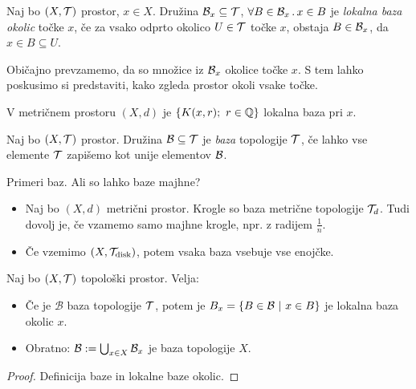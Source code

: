 \begin{definicija}
    Naj bo $(X, \mathcal{T})$ prostor, $x \in X$. Družina $\mathcal{B}_x \subseteq \mathcal{T}$, $\forall B \in \mathcal{B}_x \,.\, x \in B$ je \emph{lokalna baza okolic} točke $x$, če za vsako odprto okolico $U \in \mathcal{T}$ točke $x$, obstaja $B \in \mathcal{B}_x$, da $x \in B \subseteq U$.
\end{definicija}

\begin{opomba}
    Običajno prevzamemo, da so množice iz $\mathcal{B}_x$ okolice točke $x$. S tem lahko poskusimo si predstaviti, kako zgleda prostor okoli vsake točke.
\end{opomba}

\begin{primer}
    V metričnem prostoru $(X, d)$ je $\left\{K(x,r); \ r \in \mathbb{Q}\right\}$ lokalna baza pri $x$.
\end{primer}

\begin{definicija}
    Naj bo $(X, \mathcal{T})$ prostor. Družina $\mathcal{B} \subseteq \mathcal{T}$ je \emph{baza} topologije $\mathcal{T}$, če lahko vse elemente $\mathcal{T}$ zapišemo kot unije elementov $\mathcal{B}$.
\end{definicija}

\begin{primer}
    Primeri baz. Ali so lahko baze majhne?
    \begin{itemize}
        \item Naj bo $(X, d)$ metrični prostor. Krogle so baza metrične topologije $\mathcal{T}_d$. Tudi dovolj je, če vzamemo samo majhne krogle, npr. z radijem $\frac{1}{n}$.
        \item Če vzemimo $(X, \mathcal{T}_\text{disk})$, potem vsaka baza vsebuje vse enojčke.        
    \end{itemize}
\end{primer}

\begin{trditev}
    Naj bo $(X, \mathcal{T})$ topološki prostor. Velja:
    \begin{itemize}
        \item  Če je $\mathcal{B}$ baza topologije $\mathcal{T}$, potem je $B_x = \left\{B \in \mathcal{B} \ | \ x \in B\right\}$ je lokalna baza okolic $x$.
        \item Obratno: $\mathcal{B} := \bigcup_{x \in X} \mathcal{B}_x$ je baza topologije $X$.
    \end{itemize}    
\end{trditev}

\begin{proof}
    Definicija baze in lokalne baze okolic.
\end{proof}

